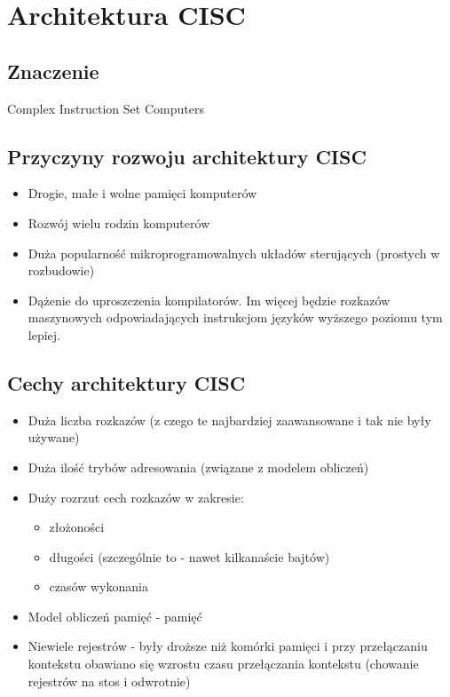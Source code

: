 \documentclass[a4paper,twoside]{article}
\begin{document}
    
    
\section*{Architektura CISC}
	\subsection*{Znaczenie} \noindent
	Complex Instruction Set Computers
	
	\subsection*{Przyczyny rozwoju architektury CISC}
    	\begin{itemize}
        \item Drogie, małe i wolne pamięci komputerów
        \item Rozwój wielu rodzin komputerów
        \item Duża popularność mikroprogramowalnych układów sterujących (prostych w rozbudowie)
        \item Dążenie do uproszczenia kompilatorów. Im więcej będzie rozkazów maszynowych odpowiadających instrukcjom języków wyższego poziomu tym lepiej.
        \end{itemize}
    
    \subsection*{Cechy architektury CISC}
    	\begin{itemize}
        \item Duża liczba rozkazów (z czego te najbardziej zaawansowane i tak nie były używane)
        \item Duża ilość trybów adresowania (związane z modelem obliczeń)
        \item Duży rozrzut cech rozkazów w zakresie:
        \begin{itemize}
	        \item złożoności
	        \item długości (szczególnie to - nawet kilkanaście bajtów)
	        \item czasów wykonania
        \end{itemize}
        \item Model obliczeń pamięć - pamięć
        \item Niewiele rejestrów - były droższe niż komórki pamięci i przy przełączaniu kontekstu obawiano się wzrostu czasu przełączania kontekstu (chowanie rejestrów na stos i odwrotnie)
        \end{itemize}
   
\end{document}
